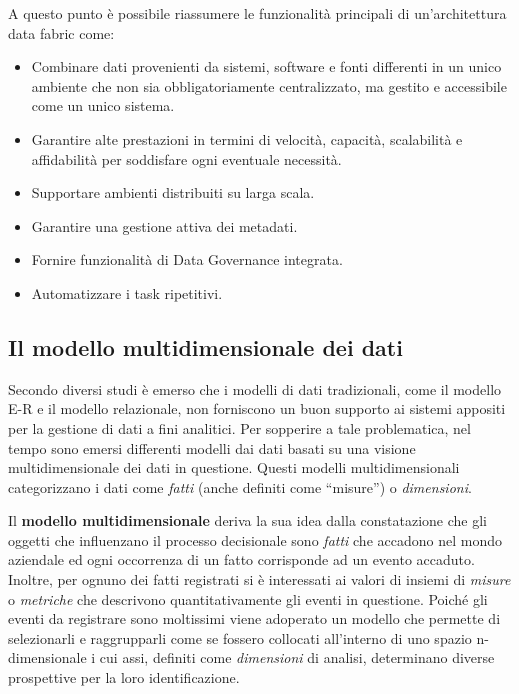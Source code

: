 A questo punto è possibile riassumere le funzionalità principali di un’architettura data fabric come:\cite{gft_data_fabric}
\begin{itemize}
    \item Combinare dati provenienti da sistemi, software e fonti differenti in un unico ambiente che non sia obbligatoriamente centralizzato, ma gestito e accessibile come un unico sistema.
    \item Garantire alte prestazioni in termini di velocità, capacità, scalabilità e affidabilità per soddisfare ogni eventuale necessità.
    \item Supportare ambienti distribuiti su larga scala.
    \item Garantire una gestione attiva dei metadati.
    \item Fornire funzionalità di Data Governance integrata.
    \item Automatizzare i task ripetitivi.
\end{itemize}

\subsection{Il modello multidimensionale dei dati}

Secondo diversi studi è emerso che i modelli di dati tradizionali, come il modello E-R e il modello relazionale, non forniscono un buon supporto ai sistemi appositi per la gestione di dati a fini analitici. Per sopperire a tale problematica, nel tempo sono emersi differenti modelli dai dati basati su una visione multidimensionale dei dati in questione. Questi modelli multidimensionali categorizzano i dati come \textit{fatti} (anche definiti come “misure”) o \textit{dimensioni}.\cite{ieee_multidimensional_data_modeling}

Il \textbf{modello multidimensionale} deriva la sua idea dalla constatazione che gli oggetti che influenzano il processo decisionale sono \textit{fatti} che accadono nel mondo aziendale ed ogni occorrenza di un fatto corrisponde ad un evento accaduto. Inoltre, per ognuno dei fatti registrati si è interessati ai valori di insiemi di \textit{misure} o \textit{metriche} che descrivono quantitativamente gli eventi in questione. Poiché gli eventi da registrare sono moltissimi viene adoperato un modello che permette di selezionarli e raggrupparli come se fossero collocati all’interno di uno spazio n-dimensionale i cui assi, definiti come \textit{dimensioni} di analisi, determinano diverse prospettive per la loro identificazione.\cite{unibo_introduzione_al_data_warehousing}

